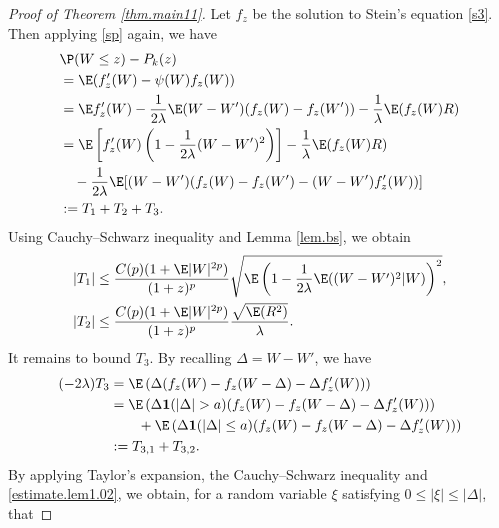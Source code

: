 \begin{proof}[Proof of Theorem \ref{thm.main11}]
	Let $f_z$ be the solution to Stein's equation \eqref{s3}. Then applying \eqref{sp} again, we have
	\begin{equation} \label{s4}
		\begin{split}
			&\P(W \le z) - P_k(z)\\
			&= \E(f_z'(W) - \psi(W)f_z(W))   \\
			&= \E f_z'(W) - \dfrac{1}{2\lambda} \E(W-W')(f_z(W)-f_z(W')) - \dfrac{1}{\lambda} \E(f_z(W)R)   \\
			&= \E \left[f'_z(W)\left(1- \dfrac{1}{2\lambda}(W - W')^2\right)\right] - \dfrac{1}{\lambda} \E(f_z(W)R) \\
			& \quad  - \dfrac{1}{2\lambda} \E[(W-W')(f_z(W)-f_z(W')- (W-W')f'_z(W))]    \\    
			&:= T_1 + T_2 +T_3.					  	  
	\end{split} \end{equation} 
Using Cauchy--Schwarz inequality and Lemma \ref{lem.bs},  we obtain 
	\begin{align} \label{b01}
		\begin{aligned}
			|T_1| %
			&\le \dfrac{C(p)(1+\E|W|^{2p})}{(1+z)^p }\sqrt{\E\left( 1- \dfrac{1}{2\lambda}\E((W-W')^2|W)\right)^2 },\\
			|T_2|  %
			&\le \dfrac{C(p)(1+\E|W|^{2p})}{(1+z)^p}\dfrac{\sqrt{\E(R^2)}}{\lambda}.
	\end{aligned} \end{align}
It remains to bound $T_3$. By recalling $\Delta=W-W'$, we have
	\begin{align} \label{s5}
		\begin{aligned}
			(-2\lambda)T_3 
			&= \E\left(\Delta(f_{z}(W)-f_{z}(W-\Delta)- \Delta f_{z}'(W))\right) \\
			&= \E\left(\Delta \mathbf{1}(|\Delta|>a)(f_{z}(W)-f_{z}(W-\Delta)- \Delta f_{z}'(W))\right)  \\
			&\quad \quad +\E\left(\Delta \mathbf{1}(|\Delta|\le a)(f_{z}(W)-f_{z}(W-\Delta)- \Delta f_{z}'(W))\right)\\
			&:= T_{3,1} + T_{3,2}.
		\end{aligned}
	\end{align}
		By applying Taylor's expansion, the Cauchy--Schwarz inequality and \eqref{estimate.lem1.02}, we obtain,
for a random variable $\xi$ satisfying $0\le |\xi| \le |\Delta|$, that

\end{proof}
